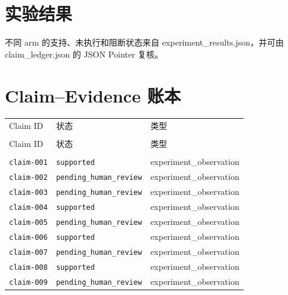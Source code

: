 \documentclass[UTF8]{ctexart}
\begin{document}
\section{实验结果}
不同 arm 的支持、未执行和阻断状态来自 experiment\_\allowbreak{}results.json，并可由 claim\_\allowbreak{}ledger.json 的 JSON Pointer 复核。
\section{Claim--Evidence 账本}
\begin{longtable}{@{}>{\raggedright\arraybackslash}p{}>{\raggedright\arraybackslash}p{}>{\raggedright\arraybackslash}p{}@{}}
\toprule
Claim ID & 状态 & 类型\\\\
\midrule
\endfirsthead
\toprule
Claim ID & 状态 & 类型\\\\
\midrule
\endhead
\texttt{\scriptsize claim-\allowbreak{}001} & \texttt{\scriptsize supported} & experiment\_\allowbreak{}observation \\
\texttt{\scriptsize claim-\allowbreak{}002} & \texttt{\scriptsize pending\_\allowbreak{}human\_\allowbreak{}review} & experiment\_\allowbreak{}observation \\
\texttt{\scriptsize claim-\allowbreak{}003} & \texttt{\scriptsize pending\_\allowbreak{}human\_\allowbreak{}review} & experiment\_\allowbreak{}observation \\
\texttt{\scriptsize claim-\allowbreak{}004} & \texttt{\scriptsize supported} & experiment\_\allowbreak{}observation \\
\texttt{\scriptsize claim-\allowbreak{}005} & \texttt{\scriptsize pending\_\allowbreak{}human\_\allowbreak{}review} & experiment\_\allowbreak{}observation \\
\texttt{\scriptsize claim-\allowbreak{}006} & \texttt{\scriptsize supported} & experiment\_\allowbreak{}observation \\
\texttt{\scriptsize claim-\allowbreak{}007} & \texttt{\scriptsize pending\_\allowbreak{}human\_\allowbreak{}review} & experiment\_\allowbreak{}observation \\
\texttt{\scriptsize claim-\allowbreak{}008} & \texttt{\scriptsize supported} & experiment\_\allowbreak{}observation \\
\texttt{\scriptsize claim-\allowbreak{}009} & \texttt{\scriptsize pending\_\allowbreak{}human\_\allowbreak{}review} & experiment\_\allowbreak{}observation \\

\end{longtable}
\end{document}
